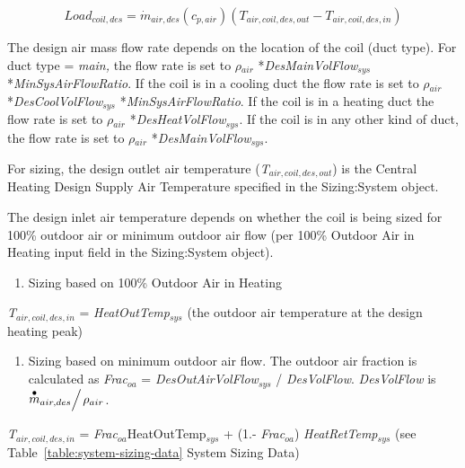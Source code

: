 \begin{equation}
Loa{d_{coil,des}} = {\dot m_{air,des}}({c_{p,air}})({T_{air,coil,des,out}} - {T_{air,coil,des,in}})
\end{equation}

The design air mass flow rate depends on the location of the coil (duct type). For duct type = \emph{main,} the flow rate is set to \emph{\(\rho\)\(_{air}\)} *\emph{DesMainVolFlow\(_{sys}\)} *\emph{MinSysAirFlowRatio}. If the coil is in a cooling duct the flow rate is set to \emph{\(\rho\)\(_{air}\)} *\emph{DesCoolVolFlow\(_{sys}\)} *\emph{MinSysAirFlowRatio}. If the coil is in a heating duct the flow rate is set to \emph{\(\rho\)\(_{air}\)} *\emph{DesHeatVolFlow\(_{sys}\)}. If the coil is in any other kind of duct, the flow rate is set to \emph{\(\rho\)\(_{air}\)} *\emph{DesMainVolFlow\(_{sys}\)}.

For sizing, the design outlet air temperature (\emph{T\(_{air,coil,des,out}\)}) is the Central Heating Design Supply Air Temperature specified in the Sizing:System object.

The design inlet air temperature depends on whether the coil is being sized for 100\% outdoor air or minimum outdoor air flow (per 100\% Outdoor Air in Heating input field in the Sizing:System object).

\begin{enumerate}
\def\labelenumi{\arabic{enumi})}
\tightlist
\item
  Sizing based on 100\% Outdoor Air in Heating
\end{enumerate}

\emph{T\(_{air,coil,des,in}\)} = \emph{HeatOutTemp\(_{sys}\)} (the outdoor air temperature at the design heating peak)

\begin{enumerate}
\def\labelenumi{\arabic{enumi})}
\setcounter{enumi}{1}
\tightlist
\item
  Sizing based on minimum outdoor air flow. The outdoor air fraction is calculated as \emph{Frac}\(_{oa}\) = \emph{DesOutAirVolFlow\(_{sys}\)} / \emph{DesVolFlow}. \emph{DesVolFlow} is \({{{{\mathop m\limits^ \bullet }_{air,des}}} \mathord{\left/ {\vphantom {{{{\mathop m\limits^ \bullet }_{air,des}}} {{\rho_{air}}}}} \right. } {{\rho_{air}}}}\).
\end{enumerate}

\emph{T\(_{air,coil,des,in}\)} = \emph{Frac}\(_{oa}\)HeatOutTemp\(_{sys}\) + (1.- \emph{Frac\(_{oa}\)}) \emph{HeatRetTemp\(_{sys}\)} (see Table~\ref{table:system-sizing-data} System Sizing Data)

